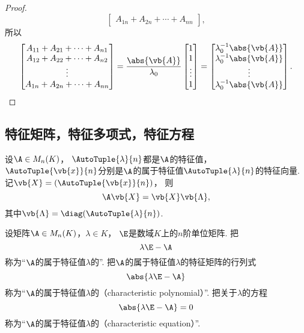 \begin{example}
\begin{proof}
\begin{equation*}
\begin{bmatrix}
		A_{1n} + A_{2n} + \dotsb + A_{nn}
	\end{bmatrix},
\end{equation*}
所以\begin{equation*}
	\begin{bmatrix}
		A_{11} + A_{21} + \dotsb + A_{n1} \\
		A_{12} + A_{22} + \dotsb + A_{n2} \\
		\vdots \\
		A_{1n} + A_{2n} + \dotsb + A_{nn}
	\end{bmatrix}
	= \frac{\abs{\vb{A}}}{\lambda_0}
	\begin{bmatrix}
		1 \\ 1 \\ \vdots \\ 1
	\end{bmatrix}
	= \begin{bmatrix}
		\lambda_0^{-1} \abs{\vb{A}} \\ \lambda_0^{-1} \abs{\vb{A}} \\ \vdots \\ \lambda_0^{-1} \abs{\vb{A}}
	\end{bmatrix}.
	\qedhere
\end{equation*}
\end{proof}
\end{example}

\subsection{特征矩阵，特征多项式，特征方程}
\begin{proposition}
设\(\A \in M_n(K)\)，
\(\AutoTuple{\lambda}{n}\)都是\(\A\)的特征值，
\(\AutoTuple{\vb{x}}{n}\)分别是\(\A\)的属于特征值\(\AutoTuple{\lambda}{n}\)的特征向量.
记\(\vb{X} = (\AutoTuple{\vb{x}}{n})\)，
则\[
	\A \vb{X} = \vb{X} \vb{\Lambda},
\]
其中\(\vb{\Lambda} = \diag(\AutoTuple{\lambda}{n})\).
\end{proposition}

\begin{definition}
设矩阵\(\A \in M_n(K)\)，\(\lambda \in K\)，
\(\E\)是数域\(K\)上的\(n\)阶单位矩阵.
把\[
	\lambda\E-\A
\]称为“\(\A\)的属于特征值\(\lambda\)的”.
把\(\A\)的属于特征值\(\lambda\)的特征矩阵的行列式\[
	\abs{\lambda\E-\A}
\]称为“\(\A\)的属于特征值\(\lambda\)的（characteristic polynomial）”.
把关于\(\lambda\)的方程\[
	\abs{\lambda\E-\A}=0
\]称为“\(\A\)的属于特征值\(\lambda\)的（characteristic equation）”.
\end{definition}

